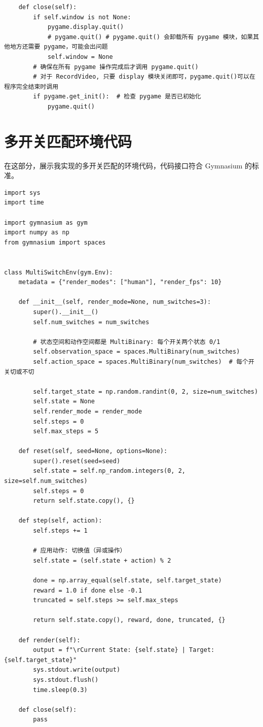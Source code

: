 \documentclass[citestyle=gb7714-2015, bibstyle=gb7714-2015,lang=cn,14pt,scheme=chinese]{elegantbook}
\begin{document}
\begin{verbatim}
    def close(self):
        if self.window is not None:
            pygame.display.quit()
            # pygame.quit() # pygame.quit() 会卸载所有 pygame 模块，如果其他地方还需要 pygame，可能会出问题
            self.window = None
        # 确保在所有 pygame 操作完成后才调用 pygame.quit()
        # 对于 RecordVideo, 只要 display 模块关闭即可，pygame.quit()可以在程序完全结束时调用
        if pygame.get_init():  # 检查 pygame 是否已初始化
            pygame.quit()
\end{verbatim}

\section{多开关匹配环境代码}\label{sec:multi-switch-env}

在这部分，展示我实现的多开关匹配的环境代码，代码接口符合 Gymnasium 的标准。

\begin{verbatim}
import sys
import time

import gymnasium as gym
import numpy as np
from gymnasium import spaces


class MultiSwitchEnv(gym.Env):
    metadata = {"render_modes": ["human"], "render_fps": 10}

    def __init__(self, render_mode=None, num_switches=3):
        super().__init__()
        self.num_switches = num_switches

        # 状态空间和动作空间都是 MultiBinary: 每个开关两个状态 0/1
        self.observation_space = spaces.MultiBinary(num_switches)
        self.action_space = spaces.MultiBinary(num_switches)  # 每个开关切或不切

        self.target_state = np.random.randint(0, 2, size=num_switches)
        self.state = None
        self.render_mode = render_mode
        self.steps = 0
        self.max_steps = 5

    def reset(self, seed=None, options=None):
        super().reset(seed=seed)
        self.state = self.np_random.integers(0, 2, size=self.num_switches)
        self.steps = 0
        return self.state.copy(), {}

    def step(self, action):
        self.steps += 1

        # 应用动作: 切换值（异或操作）
        self.state = (self.state + action) % 2

        done = np.array_equal(self.state, self.target_state)
        reward = 1.0 if done else -0.1
        truncated = self.steps >= self.max_steps

        return self.state.copy(), reward, done, truncated, {}

    def render(self):
        output = f"\rCurrent State: {self.state} | Target: {self.target_state}"
        sys.stdout.write(output)
        sys.stdout.flush()
        time.sleep(0.3)

    def close(self):
        pass
\end{verbatim}
\end{document}
